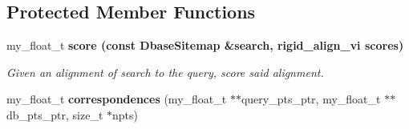 \subsection*{Protected Member Functions}
\begin{CompactItemize}
\item 
my\_\-float\_\-t \bf{score} (const \bf{Dbase\-Sitemap} \&search, rigid\_\-align\_\-vi scores)
\begin{CompactList}\small\item\em Given an alignment of search to the query, score said alignment. \item\end{CompactList}\item 
my\_\-float\_\-t \textbf{correspondences} (my\_\-float\_\-t $\ast$$\ast$query\_\-pts\_\-ptr, my\_\-float\_\-t $\ast$$\ast$db\_\-pts\_\-ptr, size\_\-t $\ast$npts)\label{classASCbase_1_1TestScoring_1bce69b267b72ae43cd980caa7fcfd0e}

\end{CompactItemize}
